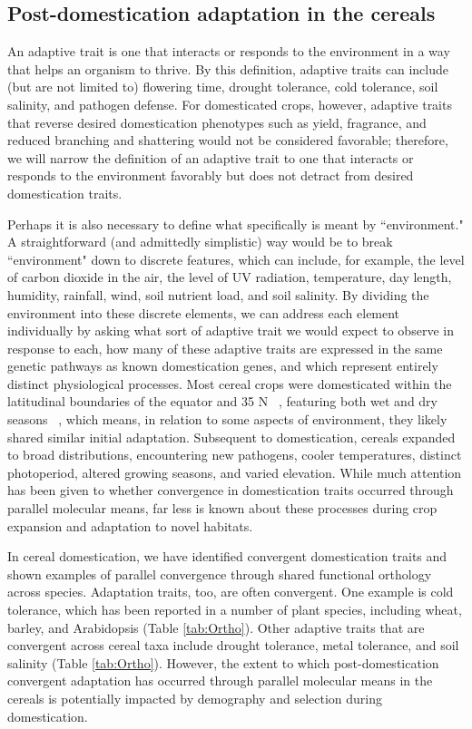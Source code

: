 \documentclass[12pt]{article}
\begin{document}
\subsection*{Post-domestication adaptation in the cereals}

An adaptive trait is one that interacts or responds to the environment in a way that helps an organism to thrive. 
By this definition, adaptive traits can include (but are not limited to) flowering time, drought tolerance, cold tolerance, soil salinity, and pathogen defense. 
For domesticated crops, however, adaptive traits that reverse desired domestication phenotypes such as yield, fragrance, and reduced branching and shattering would not be considered favorable; therefore, we will narrow the definition of an adaptive trait to one that interacts or responds to the environment favorably but does not detract from desired domestication traits. 

Perhaps it is also necessary to define what specifically is meant by ``environment."
A straightforward (and admittedly simplistic) way would be to break ``environment" down to discrete features, which can include, for example, the level of carbon dioxide in the air, the level of UV radiation, temperature, day length, humidity, rainfall, wind, soil nutrient load, and soil salinity. 
By dividing the environment into these discrete elements, we can address each element individually by asking what sort of adaptive trait we would expect to observe in response to each, how many of these adaptive traits are expressed in the same genetic pathways as known domestication genes, and which represent entirely distinct physiological processes.
Most cereal crops were domesticated within the latitudinal boundaries of the equator and 35 N ~\citep{Jain1993, Gepts2010}, featuring both wet and dry seasons ~\citep{Jain1993}, which means, in relation to some aspects of environment, they likely shared similar initial adaptation.
Subsequent to domestication, cereals expanded to broad distributions, encountering new pathogens, cooler temperatures, distinct photoperiod, altered growing seasons, and varied elevation.
While much attention has been given to whether convergence in domestication traits occurred through parallel molecular means, far less is known about these processes during crop expansion and adaptation to novel habitats.

In cereal domestication, we have identified convergent domestication traits and shown examples of parallel convergence through shared functional orthology across species. 
Adaptation traits, too, are often convergent.
One example is cold tolerance, which has been reported in a number of plant species, including wheat, barley, and Arabidopsis (Table \ref{tab:Ortho}). 
Other adaptive traits that are convergent across cereal taxa include drought tolerance, metal tolerance, and soil salinity (Table \ref{tab:Ortho}).
However, the extent to which post-domestication convergent adaptation has occurred through parallel molecular means in the cereals is potentially impacted by demography and selection during domestication.
\end{document}
